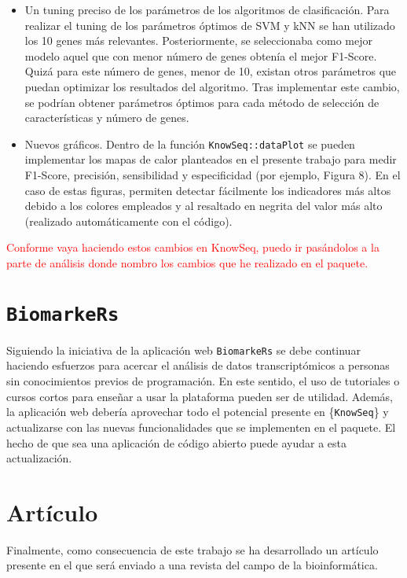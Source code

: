 \begin{itemize}
	\item Un tuning preciso de los parámetros de los algoritmos de clasificación. Para realizar el tuning de los parámetros óptimos de SVM y kNN se han utilizado los 10 genes más relevantes. Posteriormente, se seleccionaba como mejor modelo aquel que con menor número de genes obtenía el mejor F1-Score. Quizá para este número de genes, menor de 10, existan otros parámetros que puedan optimizar los resultados del algoritmo. Tras implementar este cambio, se podrían obtener parámetros óptimos para cada método de selección de características y número de genes.
	\item Nuevos gráficos. Dentro de la función \texttt{KnowSeq::dataPlot} se pueden implementar los mapas de calor planteados en el presente trabajo para medir F1-Score, precisión, sensibilidad y especificidad (por ejemplo, Figura 8). En el caso de estas figuras, permiten detectar fácilmente los indicadores más altos debido a los colores empleados y al resaltado en negrita del valor más alto (realizado automáticamente con el código).
\end{itemize}

\textcolor{red}{Conforme vaya haciendo estos cambios en KnowSeq, puedo ir pasándolos a la parte de análisis donde nombro los cambios que he realizado en el paquete.}

\section{\texttt{BiomarkeRs}}

Siguiendo la iniciativa de la aplicación web \texttt{BiomarkeRs} se debe continuar haciendo esfuerzos para acercar el análisis de datos transcriptómicos a personas sin conocimientos previos de programación. En este sentido, el uso de tutoriales o cursos cortos para enseñar a usar la plataforma pueden ser de utilidad. Además, la aplicación web debería aprovechar todo el potencial presente en \{\texttt{KnowSeq}\} y actualizarse con las nuevas funcionalidades que se implementen en el paquete. El hecho de que sea una aplicación de código abierto puede ayudar a esta actualización. \\

\section{Artículo}

Finalmente, como consecuencia de este trabajo se ha desarrollado un artículo presente en el  que será enviado a una revista del campo de la bioinformática.




